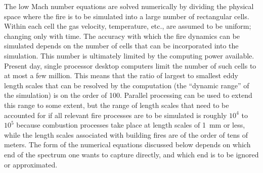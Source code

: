 The low Mach number equations are solved numerically by dividing the physical space where
the fire is to be simulated into a large number of rectangular cells. Within each cell the gas
velocity, temperature, etc., are assumed to be uniform; changing only with time.
The accuracy with which the fire dynamics can be simulated depends on the number of cells
that can be incorporated into the simulation. This number is ultimately limited
by the computing power available. Present day, single processor desktop computers limit the number of
such cells to at most a few million. This means that the ratio of largest to smallest eddy length
scales that can be resolved by the computation (the ``dynamic range'' of the simulation) is on the order of 100.
Parallel processing can be used to extend this range to some extent, but
the range of length scales that need to be accounted for if all relevant
fire processes are to be simulated is roughly $10^4$ to $10^5$ because combustion processes take place at
length scales of \SI{1}{\milli m} or less, while the length scales associated with building fires are of the order of
tens of meters. The form of the numerical equations discussed below depends on which end of the
spectrum one wants to capture directly, and which end is to be ignored or approximated.


